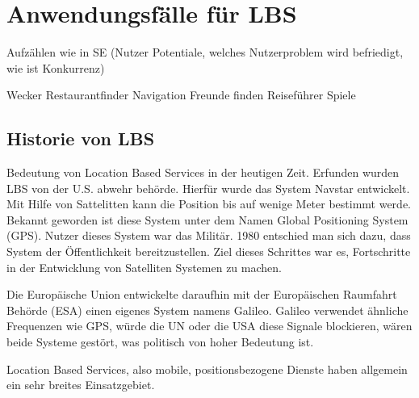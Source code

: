 \section{Anwendungsfälle für LBS}

Aufzählen wie in SE (Nutzer Potentiale, welches Nutzerproblem wird befriedigt, wie ist Konkurrenz)

Wecker
Restaurantfinder
Navigation
Freunde finden
Reiseführer
Spiele


\subsection{Historie von LBS}
Bedeutung von Location Based Services in der heutigen Zeit. Erfunden wurden LBS von der U.S. abwehr behörde. Hierfür wurde das System Navstar entwickelt. Mit Hilfe von Sattelitten kann die Position bis auf wenige Meter bestimmt werde. Bekannt geworden ist diese System unter dem Namen Global Positioning System (GPS). Nutzer dieses System war das Militär. 1980 entschied man sich dazu, dass System der Öffentlichkeit bereitzustellen. Ziel dieses Schrittes war es, Fortschritte in der Entwicklung von Satelliten Systemen zu machen.

Die Europäische Union entwickelte daraufhin mit der Europäischen Raumfahrt Behörde (ESA) einen eigenes System namens Galileo. Galileo verwendet ähnliche Frequenzen wie GPS, würde die UN oder die USA diese Signale blockieren, wären beide Systeme gestört, was politisch von hoher Bedeutung ist.




Location Based Services, also mobile, positionsbezogene Dienste haben allgemein ein sehr breites Einsatzgebiet.\\
